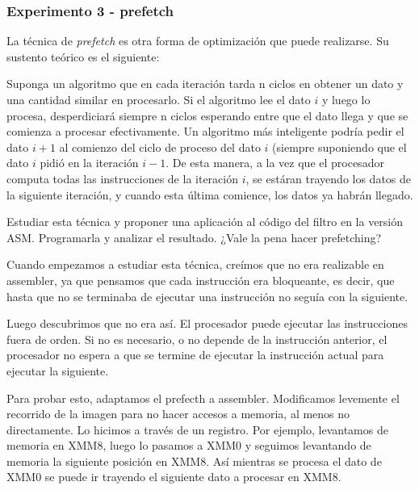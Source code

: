 \vspace*{0.3cm} \noindent
\subsubsection{Experimento 3 - prefetch}

  La técnica de \textit{prefetch} es otra forma de optimización que puede
  realizarse. Su sustento teórico es el siguiente:
  
  Suponga un algoritmo que en cada iteración tarda n ciclos en obtener un dato y una cantidad
  similar en procesarlo. Si el algoritmo lee el dato $i$ y luego lo procesa,
  desperdiciará siempre n ciclos esperando entre que el dato llega y que se comienza
  a procesar efectivamente. Un algoritmo más inteligente podría pedir el 
  dato $i+1$ al comienzo del ciclo de proceso del dato $i$ (siempre suponiendo
  que el dato $i$ pidió en la iteración $i-1$. De esta manera, a la vez que el
  procesador computa todas las instrucciones de la iteración $i$, se estáran trayendo
  los datos de la siguiente iteración, y cuando esta última comience, los datos ya
  habrán llegado.  \vspace*{0.2cm}

  

  Estudiar esta técnica y proponer una aplicación al código del filtro en la versión ASM.
  Programarla y analizar el resultado. ¿Vale la pena hacer prefetching?\vspace*{0.2cm}
  
  
  
  
  Cuando empezamos a estudiar esta técnica, creímos que no era realizable en assembler, 
  ya que pensamos que cada instrucción era bloqueante, es decir, 
  que hasta que no se terminaba de ejecutar una instrucción no seguía con la siguiente. \vspace*{0.2cm}
 
 
 
  Luego descubrimos que no era así. El procesador puede ejecutar las instrucciones fuera de orden. 
  Si no es necesario, o no depende de la instrucción anterior, el procesador no espera a que se 
  termine de ejecutar la instrucción actual para ejecutar la siguiente.\vspace*{0.2cm}



  Para probar esto, adaptamos el prefecth a assembler. Modificamos levemente el recorrido de la 
  imagen para no hacer accesos a memoria, al menos no directamente. Lo hicimos a través de un registro.
  Por ejemplo, levantamos de memoria en XMM8, luego lo pasamos a XMM0 y seguimos levantando de memoria 
  la siguiente posición en XMM8. Así mientras se procesa el dato de XMM0 se puede ir trayendo el 
  siguiente dato a procesar en XMM8.\vspace*{0.2cm}
  
